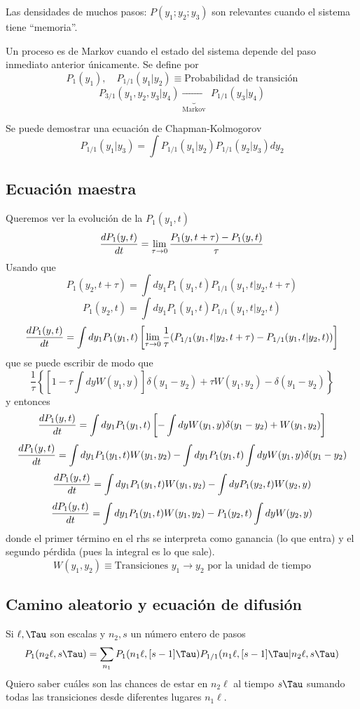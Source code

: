 \documentclass[10pt,oneside]{CBFT_book}
\begin{document}
Las densidades de muchos pasos: $P(y_1;y_2;y_3)$ son relevantes cuando el sistema tiene ``memoria''.

Un proceso es de Markov cuando el estado del sistema depende del paso inmediato anterior únicamente.
Se define por 
\[
	P_1(y_1) , \quad P_{1/1}(y_1|y_2) \equiv \text{Probabilidad de transición} 
\]
\[
	P_{3/1}(y_1,y_2,y_3|y_4) \underbrace{\rightarrow}_{\text{Markov}} \; P_{1/1}(y_3|y_4)
\]

Se puede demostrar una ecuación de Chapman-Kolmogorov
\[
	P_{1/1}(y_1|y_3) = \int P_{1/1}(y_1|y_2) P_{1/1}(y_2|y_3) dy_2
\]

\subsection{Ecuación maestra}

Queremos ver la evolución de la $P_1(y_1,t)$
\[
	\frac{d^{\hspace{-0.05em}} {P_1(y,t)}}{d {t}^{\hspace{-0.05em}}} = \lim_{\tau \to 0} \frac{P_1(y,t+\tau) - P_1(y,t) }{\tau}
\]
Usando que
\[
	P_1(y_2,t+\tau) = \int dy_1 P_1(y_1,t) P_{1/1}(y_1,t|y_2,t+\tau) 
\]
\[
	P_1(y_2,t) = \int dy_1 P_1(y_1,t) P_{1/1}(y_1,t|y_2,t) 
\]
\[
	\frac{d^{\hspace{-0.05em}} {P_1(y,t)}}{d {t}^{\hspace{-0.05em}}} = \int dy_1 P_1(y_1,t) \left[ \lim_{\tau \to 0} 
	\frac{1}{\tau} (P_{1/1}(y_1,t|y_2,t+\tau) - P_{1/1}(y_1,t|y_2,t))   \right]
\]
que se puede escribir de modo que 
\[
	\frac{1}{\tau} \left\{ [ 1 - \tau \int dy W(y_1,y)]\delta(y_1 - y_2) + \tau W(y_1,y_2) - \delta(y_1-y_2) 
\right\}
\]
y entonces 
\[
	\frac{d^{\hspace{-0.05em}} {P_1(y,t)}}{d {t}^{\hspace{-0.05em}}} = \int dy_1 P_1(y_1,t) \left[ -\int dy W(y_1,y) \delta(y_1-y_2) + W(y_1,y_2) \right]
\]
\[
	\frac{d^{\hspace{-0.05em}} {P_1(y,t)}}{d {t}^{\hspace{-0.05em}}} = \int dy_1 P_1(y_1,t) W(y_1,y_2) - \int dy_1 P_1(y_1,t) \int dy W(y_1,y)\delta(y_1-y_2)
\]
\[
	\frac{d^{\hspace{-0.05em}} {P_1(y,t)}}{d {t}^{\hspace{-0.05em}}} = \int dy_1 P_1(y_1,t) W(y_1,y_2) - \int dy P_1(y_2,t) W(y_2,y)
\]
\[
	\frac{d^{\hspace{-0.05em}} {P_1(y,t)}}{d {t}^{\hspace{-0.05em}}} = \int dy_1 P_1(y_1,t) W(y_1,y_2) - P_1(y_2,t) \int dy  W(y_2,y)
\]
donde el primer término en el rhs se interpreta como ganancia (lo que entra) y el segundo pérdida (pues la integral es 
lo que sale).
\[
	W(y_1,y_2) \equiv \text{Transiciones $y_1\to y_2$ por la unidad de tiempo}
\]

\subsection{Camino aleatorio y ecuación de difusión}

Si $\ell, \Tau$ son escalas y $n_2,s$ un número entero de pasos 
\[
	P_1(n_2\ell, s\Tau ) = \sum_{n_1} P_1( n_1\ell, [s-1]\Tau )P_{1/1}( n_1\ell, [s-1]\Tau|n_2\ell, s\Tau )
\]
Quiero saber cuáles son las chances de estar en $n_2\ell$ al tiempo $s\Tau$ sumando todas 
las
transiciones desde diferentes lugares $n_1\ell$.
\end{document}

